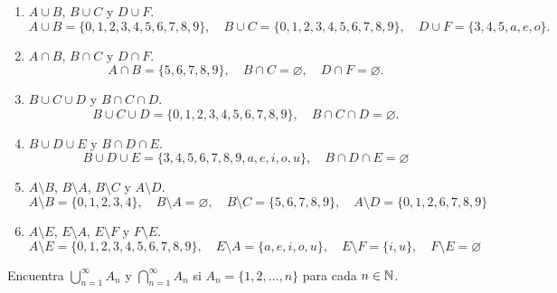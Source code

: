 \documentclass[12pt,a4paper]{book}
\begin{document}
    \begin{solucion}
        \begin{enumerate}
            \item[(a)] $A\cup B$, $B\cup C$ y $D\cup F$.
            \begin{equation*}
                A\cup B=\{0,1,2,3,4,5,6,7,8,9\},\quad B\cup C=\{0,1,2,3,4,5,6,7,8,9\},\quad D\cup F=\{3,4,5,a,e,o\}.
            \end{equation*}
            \item[(b)] $A\cap B$, $B\cap C$ y $D\cap F$.
            \begin{equation*}
                A\cap B=\{5,6,7,8,9\},\quad B\cap C=\varnothing,\quad D\cap F=\varnothing.
            \end{equation*}
            \item[(c)] $B\cup C\cup D$ y $B\cap C\cap D$.
            \begin{equation*}
                B\cup C\cup D=\{0,1,2,3,4,5,6,7,8,9\},\quad B\cap C\cap D=\varnothing.
            \end{equation*}
            \item[(d)] $B\cup D\cup E$ y $B\cap D\cap E$.
            \begin{equation*}
                B\cup D\cup E=\{3,4,5,6,7,8,9,a,e,i,o,u\},\quad B\cap D\cap E=\varnothing
            \end{equation*}
            \item[(e)] $A\setminus B$, $B\setminus A$, $B\setminus C$ y $A\setminus D$.
            \begin{equation*}
                A\setminus B=\{0,1,2,3,4\},\quad B\setminus A=\varnothing,\quad B\setminus C=\{5,6,7,8,9\},\quad A\setminus D=\{0,1,2,6,7,8,9\}
            \end{equation*}
            \item[(f)] $A\setminus E$, $E\setminus A$, $E\setminus F$ y $F\setminus E$.
            \begin{equation*}
                A\setminus E=\{0,1,2,3,4,5,6,7,8,9\},\quad E\setminus A=\{a,e,i,o,u\},\quad E\setminus F=\{i,u\},\quad F\setminus E=\varnothing
            \end{equation*}
        \end{enumerate}
    \end{solucion}

    \begin{ejercicio}
        Encuentra $\bigcup_{n=1}^{\infty}A_{n}$ y $\bigcap_{n=1}^{\infty}A_{n}$ si $A_{n}=\{1,2,\dots,n\}$
        para cada $n\in\mathbb{N}$.
    \end{ejercicio}
    
\end{document}
